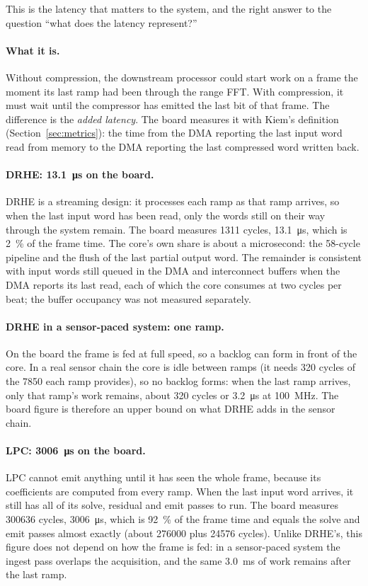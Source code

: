 This is the latency that matters to the system, and the right answer to the
question ``what does the latency represent?''

\paragraph{What it is.} Without compression, the downstream processor could
start work on a frame the moment its last ramp had been through the range FFT.
With compression, it must wait until the compressor has emitted the last bit of
that frame. The difference is the \emph{added latency}. The board measures it
with Kiem's definition (Section~\ref{sec:metrics}): the time from the DMA
reporting the last input word read from memory to the DMA reporting the last
compressed word written back.

\paragraph{DRHE: \SI{13.1}{\micro\second} on the board.} DRHE is a streaming
design: it processes each ramp as that ramp arrives, so when the last input word
has been read, only the words still on their way through the system remain. The
board measures \num{1311} cycles, \SI{13.1}{\micro\second}, which is
\SI{2}{\percent} of the frame time. The core's own share is about a
microsecond: the 58-cycle pipeline and the flush of the last partial output
word. The remainder is consistent with input words still queued in the DMA and
interconnect buffers when the DMA reports its last read, each of which the core
consumes at two cycles per beat; the buffer occupancy was not measured
separately.

\paragraph{DRHE in a sensor-paced system: one ramp.} On the board the frame is
fed at full speed, so a backlog can form in front of the core. In a real
sensor chain the core is idle between ramps (it needs 320 cycles of the
\num{7850} each ramp provides), so no backlog forms: when the last ramp arrives,
only that ramp's work remains, about 320 cycles or \SI{3.2}{\micro\second} at
\SI{100}{\mega\hertz}. The board figure is therefore an upper bound on what
DRHE adds in the sensor chain.

\paragraph{LPC: \SI{3006}{\micro\second} on the board.} LPC cannot emit anything
until it has seen the whole frame, because its coefficients are computed from
every ramp. When the last input word arrives, it still has all of its solve,
residual and emit passes to run. The board measures \num{300636} cycles,
\SI{3006}{\micro\second}, which is \SI{92}{\percent} of the frame time and
equals the solve and emit passes almost exactly (about \num{276000} plus
\num{24576} cycles). Unlike DRHE's, this figure does not depend on how the frame
is fed: in a sensor-paced system the ingest pass overlaps the acquisition, and
the same \SI{3.0}{\milli\second} of work remains after the last ramp.

